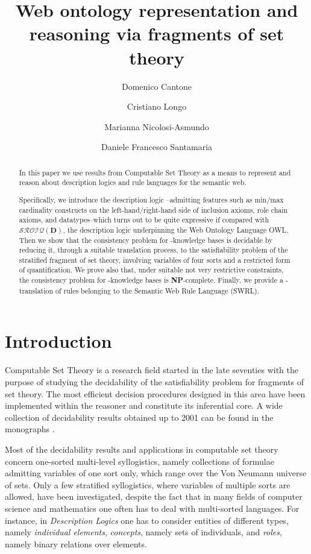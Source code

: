 \documentclass[a4paper]{llncs}
\title{Web ontology representation and reasoning via fragments of set theory}
\author{Domenico Cantone \and  Cristiano Longo \and Marianna Nicolosi-Asmundo \and Daniele Francesco Santamaria}
\institute{
University of Catania, Dept. of Mathematics and Computer Science\\
~email:~\texttt{\{cantone,longo,nicolosi\}@dmi.unict.it, daniele.f.santamaria@gmail.com}
}
\newcommand{\sroiqd}{\ensuremath{\mathcal{SROIQ}(\D)}}
\newcommand{\D}{\mathbf{D}}
\begin{document}
\maketitle


\begin{abstract}
In this paper we use results from Computable Set Theory as a means to represent and reason about description logics and rule languages for the semantic web.

Specifically, we introduce the description logic --admitting features such as min/max cardinality constructs on the left-hand/right-hand side of inclusion axioms, role chain axioms, and datatypes--which turns out to be quite expressive if compared with \sroiqd, the description logic underpinning the Web Ontology Language OWL.
Then we show that the consistency problem for -knowledge bases is decidable by reducing it, through a suitable translation process, to the satisfiability problem of the stratified fragment  of set theory, involving variables of four sorts and a restricted form of quantification.
We prove also that, under suitable not very restrictive constraints, the consistency problem for -knowledge bases is \textbf{NP}-complete.
Finally, we provide a -translation of rules belonging to the Semantic Web Rule Language (SWRL).

\end{abstract}




\section{Introduction}


Computable Set Theory is a research field started in the late seventies with the purpose of studying the decidability of the satisfiability problem for fragments of set theory. The most efficient decision procedures designed in this area have been implemented within the reasoner  \cite{SchwCanOmoPol11} and constitute its inferential core.
A wide collection of decidability results obtained up to 2001 can be found in the monographs \cite{CaFeOm90,CaOmPo01}.


Most of the decidability results and applications in computable set theory concern one-sorted multi-level syllogistics, namely collections of formulae admitting variables of one sort only, which range over the Von Neumann universe of sets. Only a few stratified syllogistics, where variables of multiple sorts are allowed, have been investigated, despite the fact that in many fields of computer science and mathematics one often has to deal with multi-sorted languages.
For instance, in \emph{Description Logics} one has to consider entities of different types, namely \emph{individual elements}, \emph{concepts}, namely sets of individuals, and \emph{roles}, namely binary relations over elements.
\end{document}
